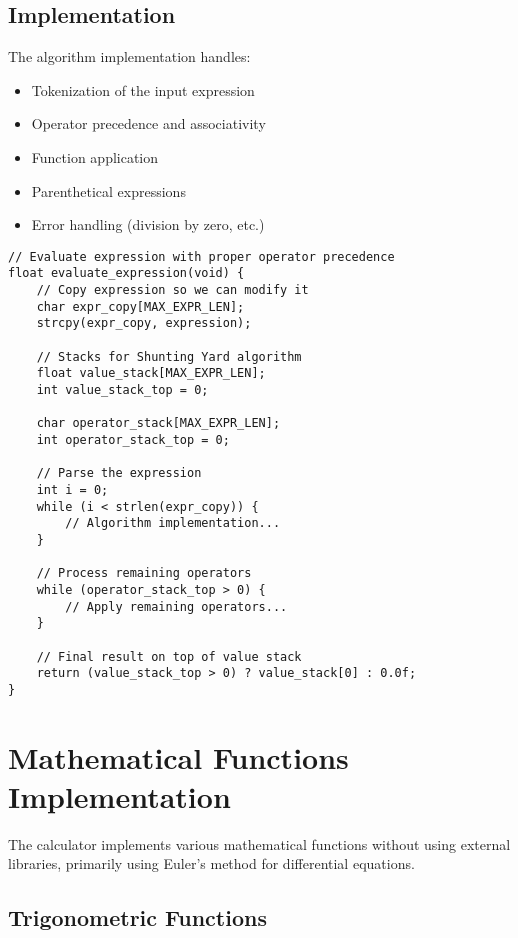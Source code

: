 \documentclass[12pt,a4paper]{article}
\begin{document}
\subsection{Implementation}

The algorithm implementation handles:
\begin{itemize}
    \item Tokenization of the input expression
    \item Operator precedence and associativity
    \item Function application
    \item Parenthetical expressions
    \item Error handling (division by zero, etc.)
\end{itemize}

\begin{lstlisting}
// Evaluate expression with proper operator precedence
float evaluate_expression(void) {
    // Copy expression so we can modify it
    char expr_copy[MAX_EXPR_LEN];
    strcpy(expr_copy, expression);
    
    // Stacks for Shunting Yard algorithm
    float value_stack[MAX_EXPR_LEN];
    int value_stack_top = 0;
    
    char operator_stack[MAX_EXPR_LEN];
    int operator_stack_top = 0;
    
    // Parse the expression
    int i = 0;
    while (i < strlen(expr_copy)) {
        // Algorithm implementation...
    }
    
    // Process remaining operators
    while (operator_stack_top > 0) {
        // Apply remaining operators...
    }
    
    // Final result on top of value stack
    return (value_stack_top > 0) ? value_stack[0] : 0.0f;
}
\end{lstlisting}

\section{Mathematical Functions Implementation}

The calculator implements various mathematical functions without using external libraries, primarily using Euler's method for differential equations.

\subsection{Trigonometric Functions}
\end{document}
